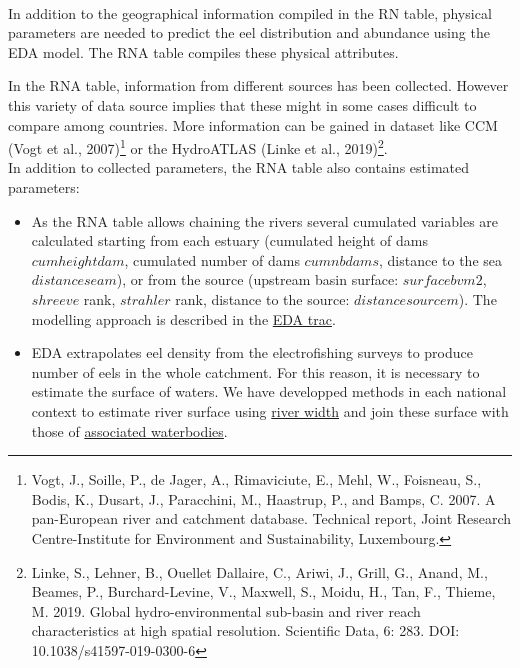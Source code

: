 \documentclass[pdftex,12pt,a4paper,svgnames]{report}\usepackage[]{graphicx}\usepackage[]{color}
\begin{document}
\begin{center}
\Huge\textsc{}\\
 \label{RNA}
\end{center}

In addition to the geographical information compiled in the RN table,
 physical parameters are needed to predict the eel distribution and
abundance using the EDA model. The RNA table compiles these physical attributes.

In the RNA table, information from different sources has been collected. However
this variety of data source implies that these might in some cases difficult to
compare among countries. More information can be gained in dataset like
CCM (Vogt et al., 2007)\footnote{Vogt, J., Soille, P., de Jager, A., Rimaviciute, E., Mehl, W.,
Foisneau, S., Bodis, K., Dusart, J., Paracchini, M., Haastrup, P., and Bamps,
C. 2007. A pan-European river and catchment database. Technical report, Joint
Research Centre-Institute for Environment and Sustainability, Luxembourg.} or
the HydroATLAS (Linke et al., 2019)\footnote{Linke, S., Lehner, B., Ouellet
Dallaire, C., Ariwi, J., Grill, G., Anand, M., Beames, P., Burchard-Levine, V.,
Maxwell, S., Moidu, H., Tan, F., Thieme, M. 2019. Global hydro-environmental
sub-basin and river reach characteristics at high spatial resolution. Scientific
Data, 6: 283. DOI: 10.1038/s41597-019-0300-6}.\\

In addition to collected parameters, the RNA table also contains estimated
parameters:

\begin{itemize}
\item As the RNA table  allows chaining the rivers several cumulated variables are calculated
starting from each estuary (cumulated height of dams
$cumheightdam$, cumulated number of dams $cumnbdams$, distance to the sea $distanceseam$), 
or from the source (upstream basin surface: $surfacebvm2$, $shreeve$ rank,
$strahler$ rank, distance to the source: $distancesourcem$). 
The modelling approach is described in the
\href{http://185.135.126.250/traceda/wiki/recipes\%20for\%20sudoang\%20database}{EDA
trac}.
\item EDA extrapolates eel density from the electrofishing surveys to produce
number of eels in the whole catchment. For this reason,
it is necessary to estimate the surface of waters. We have developped methods in
each national context to estimate river surface using
\href{http://185.135.126.250/traceda/browser/eda/EDA_Rios/river_width.Rmd}{river
width} and join these surface with those of 
\href{http://185.135.126.250/traceda/browser/eda/EDA_Rios/water_surface.Rmd}{associated waterbodies}.
\end{itemize}
\end{document}
